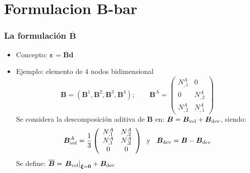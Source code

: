 \documentclass[handout]{beamer}
\begin{document}
\section{Formulacion B-bar}
\begin{frame}
\frametitle{La formulación $\overline{\bm{B}}$}
\begin{itemize}
\item Concepto: $\bm{\varepsilon}=\overline{\bm{B}} \bm{d}$
\item Ejemplo: elemento de $4$ nodos bidimensional
$$\bm{B}=(\bm{B}^{1},\bm{B}^2,\bm{B}^3,\bm{B}^4); \qquad
\bm{B}^{A}=\left(
\begin{array}{cc}
N^{A}_{,1}&0\\
0&N^{A}_{,2}\\
N^{A}_{,2}&N^{A}_{,1}
\end{array}
\right)
$$
Se considera la descomposición aditiva de $\bm{B}$ en:
$\bm{B}=\bm{B}_{\rm vol}+\bm{B}_{\rm dev}$,
siendo:
$$\bm{B}^{A}_{\rm vol}=\frac{1}{3}
\left(
\begin{array}{cc}
N^{A}_{,1}&N^{A}_{,2}\\
N^{A}_{,1}&N^{A}_{,2}\\
0&0
\end{array}
\right)
\;\;\mbox{y }\;\; \bm{B}_{\rm dev}=\bm{B}-\bm{B}_{dev}$$
Se define:
$\overline{\bm{B}}=\left. \bm{B}_{\rm vol}\right|_{\bm{\xi}=\bm{0}}+\bm{B}_{\rm dev}$
\end{itemize}
\end{frame}
\end{document}
